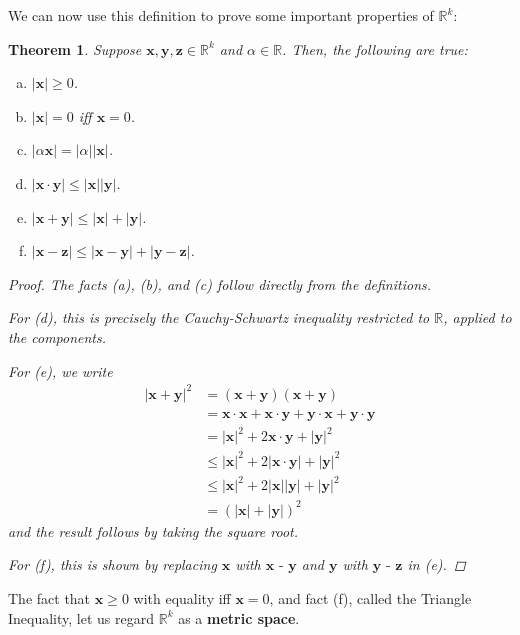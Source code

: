 \documentclass{scrbook}
\newcommand{\R}{\mathbb{R}}
\newtheorem{theorem}{Theorem}
\begin{document}
We can now use this definition to prove some important properties of $\R^k$:
\begin{theorem}
Suppose $\textbf{x}, \textbf{y}, \textbf{z} \in \R^k$ and $\alpha \in \R$. Then, the following are true:
\begin{enumerate}[(a)]
\item $|\textbf{x}| \ge 0$.
\item $|\textbf{x}| = 0$ iff $\textbf{x} = 0$.
\item $|\alpha \textbf{x}| = |\alpha| |\textbf{x}|$.
\item $|\textbf{x} \cdot \textbf{y}| \le |\textbf{x}| |\textbf{y}|$.
\item $|\textbf{x} + \textbf{y}| \le |\textbf{x}| + |\textbf{y}|$.
\item $|\textbf{x} - \textbf{z}| \le |\textbf{x} - \textbf{y}| + |\textbf{y} - \textbf{z}|$. 
\end{enumerate}
\begin{proof}
The facts (a), (b), and (c) follow directly from the definitions.

For (d), this is precisely the Cauchy-Schwartz inequality restricted to $\R$, applied to the components.

For (e), we write
\begin{align*}
	|\textbf{x} + \textbf{y}|^2 &= (\textbf{x} + \textbf{y})(\textbf{x} + \textbf{y}) \\
		&= \textbf{x} \cdot \textbf{x} + \textbf{x} \cdot \textbf{y} + \textbf{y} \cdot \textbf{x} + \textbf{y} \cdot \textbf{y} \\
		&= |\textbf{x}|^2 + 2 \textbf{x} \cdot \textbf{y} + |\textbf{y}|^2 \\
		&\le |\textbf{x}|^2 + 2 \left|\textbf{x} \cdot \textbf{y}\right| + |\textbf{y}|^2 \\
		&\le |\textbf{x}|^2 + 2 |\textbf{x}| |\textbf{y}| + |\textbf{y}|^2 \\
		&= (|\textbf{x}| + |\textbf{y}|)^2
\end{align*}
and the result follows by taking the square root.

For (f), this is shown by replacing $\textbf{x}$ with $\textbf{x - y}$ and $\textbf{y}$ with $\textbf{y - z}$ in (e).
\end{proof}
\end{theorem}

The fact that $\textbf{x} \ge 0$ with equality iff $\textbf{x} = 0$, and fact (f), called the Triangle Inequality, let us regard $\R^k$ as a \textbf{metric space}. 
\end{document}
